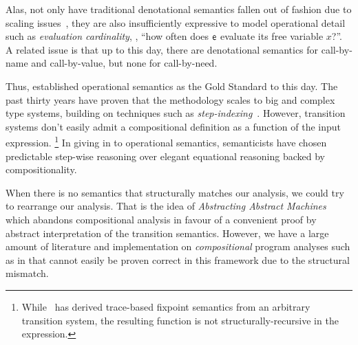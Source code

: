 Alas, not only have traditional denotational semantics fallen out of fashion
due to scaling issues~\citep{WrightFelleisen:94}, they are also insufficiently
expressive to model operational detail such as \emph{evaluation cardinality},
\eg, ``how often does $\mathsf{e}$ evaluate its free variable $x$?''.
A related issue is that up to this day, there are denotational semantics for
call-by-name and call-by-value, but none for call-by-need.

Thus, \citeauthor{WrightFelleisen:94} established operational semantics as the
Gold Standard to this day.
The past thirty years have proven that the methodology scales to
big and complex type systems, building on techniques such as
\emph{step-indexing}~\citep{AppelMcAllester:01,DreyerAhmedBirkedal:11}.
However, transition systems don't easily admit a compositional definition as a
function of the input expression.%
\footnote{While~\citet{Cousot:02} has derived trace-based fixpoint
semantics from an arbitrary transition system, the resulting function is not
structurally-recursive in the expression.}
In giving in to operational semantics, semanticists have chosen predictable
step-wise reasoning over elegant equational reasoning backed by
compositionality.


When there is no semantics that structurally matches our analysis, we could
try to rearrange our analysis. That is the idea of \emph{Abstracting Abstract
Machines}~\citep{aam} which abandons compositional analysis in favour of a
convenient proof by abstract interpretation of the transition semantics.
However, we have a large amount of literature and implementation on
\emph{compositional} program analyses such as in \citet{cardinality-ext}
that cannot easily be proven correct in this framework due to the structural
mismatch.


